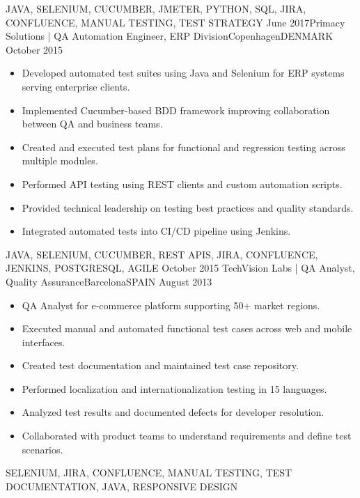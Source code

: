 \begin{experiences}
{        }
        {JAVA, SELENIUM, CUCUMBER, JMETER, PYTHON, SQL, JIRA, CONFLUENCE, MANUAL TESTING, TEST STRATEGY}
  \emptySeparator
  \experience
    {June 2017}{Primacy Solutions | QA Automation Engineer, ERP Division}{Copenhagen}{DENMARK}
    {October 2015} {
            \begin{itemize}
                \item Developed automated test suites using Java and Selenium for ERP systems serving enterprise clients.
                \item Implemented Cucumber-based BDD framework improving collaboration between QA and business teams.
                \item Created and executed test plans for functional and regression testing across multiple modules.
                \item Performed API testing using REST clients and custom automation scripts.
                \item Provided technical leadership on testing best practices and quality standards.
                \item Integrated automated tests into CI/CD pipeline using Jenkins.
            \end{itemize}
        }
        {JAVA, SELENIUM, CUCUMBER, REST APIS, JIRA, CONFLUENCE, JENKINS, POSTGRESQL, AGILE}
  \emptySeparator
  \experience
    {October 2015} {TechVision Labs | QA Analyst, Quality Assurance}{Barcelona}{SPAIN}
    {August 2013}    {
              \begin{itemize}
                \item QA Analyst for e-commerce platform supporting 50+ market regions.
                \item Executed manual and automated functional test cases across web and mobile interfaces.
                \item Created test documentation and maintained test case repository.
                \item Performed localization and internationalization testing in 15 languages.
                \item Analyzed test results and documented defects for developer resolution.
                \item Collaborated with product teams to understand requirements and define test scenarios.
              \end{itemize}
        }
        {SELENIUM, JIRA, CONFLUENCE, MANUAL TESTING, TEST DOCUMENTATION, JAVA, RESPONSIVE DESIGN}
  \emptySeparator
  \experience

\end{experiences}
